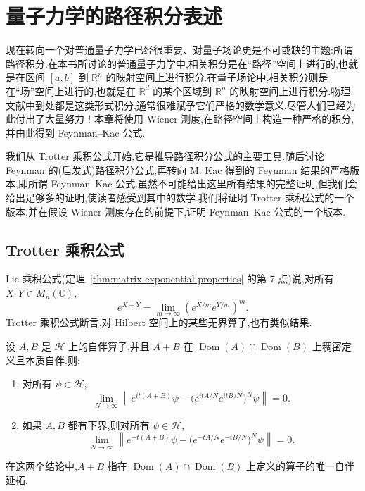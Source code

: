 \chapter{量子力学的路径积分表述}
\label{chap:path-integral}

现在转向一个对普通量子力学已经很重要、对量子场论更是不可或缺的主题:所谓路径积分.在本书所讨论的普通量子力学中,相关积分是在“路径”空间上进行的,也就是在区间 $[a,b]$ 到 $\mathbb R^n$ 的映射空间上进行积分.在量子场论中,相关积分则是在“场”空间上进行的,也就是在 $\mathbb R^d$ 的某个区域到 $\mathbb R^n$ 的映射空间上进行积分.物理文献中到处都是这类形式积分,通常很难赋予它们严格的数学意义,尽管人们已经为此付出了大量努力！本章将使用 Wiener 测度,在路径空间上构造一种严格的积分,并由此得到 Feynman--Kac 公式.

我们从 Trotter 乘积公式开始,它是推导路径积分公式的主要工具.随后讨论 Feynman 的(启发式)路径积分公式,再转向 M. Kac 得到的 Feynman 结果的严格版本,即所谓 Feynman--Kac 公式.虽然不可能给出这里所有结果的完整证明,但我们会给出足够多的证明,使读者感受到其中的数学.我们将证明 Trotter 乘积公式的一个版本,并在假设 Wiener 测度存在的前提下,证明 Feynman--Kac 公式的一个版本.

\section{Trotter 乘积公式}
\label{sec:trotter-product}

Lie 乘积公式(定理~\ref{thm:matrix-exponential-properties} 的第 7 点)说,对所有 $X,Y\in M_n(\mathbb C)$,
\[
 e^{X+Y}=\lim_{m\to\infty}(e^{X/m}e^{Y/m})^m.
\]
Trotter 乘积公式断言,对 Hilbert 空间上的某些无界算子,也有类似结果.

\begin{theorem}\label{thm:trotter-product}
设 $A,B$ 是 $\mathcal H$ 上的自伴算子,并且 $A+B$ 在 $\operatorname{Dom}(A)\cap\operatorname{Dom}(B)$ 上稠密定义且本质自伴.则:
\begin{enumerate}
\item 对所有 $\psi\in\mathcal H$,
\[
 \lim_{N\to\infty}
 \left\|e^{it(A+B)}\psi-
 \bigl(e^{itA/N}e^{itB/N}\bigr)^N\psi\right\|=0.\label{eq:trotter-unitary}
\]
\item 如果 $A,B$ 都有下界,则对所有 $\psi\in\mathcal H$,
\[
 \lim_{N\to\infty}
 \left\|e^{-t(A+B)}\psi-
 \bigl(e^{-tA/N}e^{-tB/N}\bigr)^N\psi\right\|=0.\label{eq:trotter-semigroup}
\]
\end{enumerate}
在这两个结论中,$A+B$ 指在 $\operatorname{Dom}(A)\cap\operatorname{Dom}(B)$ 上定义的算子的唯一自伴延拓.
\end{theorem}

